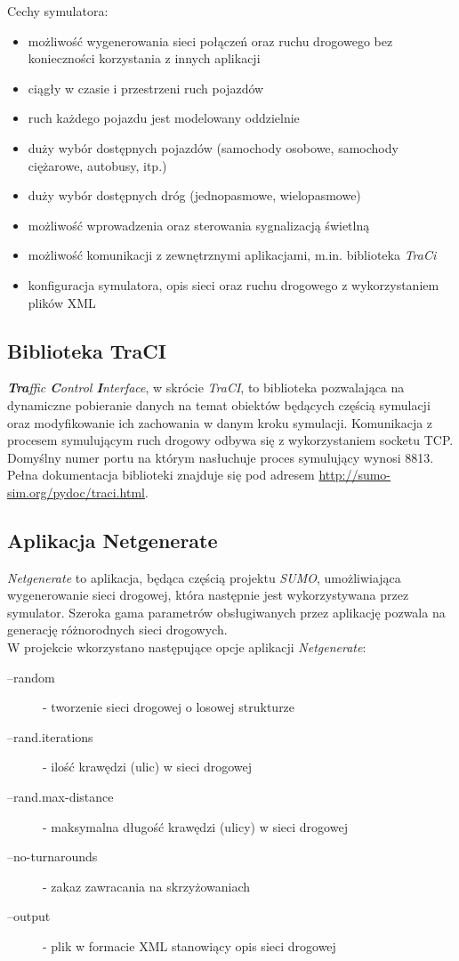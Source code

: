\documentclass[11pt,a4paper]{article}
\begin{document}
Cechy symulatora:
\begin{itemize}
	\item możliwość wygenerowania sieci połączeń oraz ruchu drogowego bez konieczności korzystania z innych aplikacji
	\item ciągły w czasie i przestrzeni ruch pojazdów
	\item ruch każdego pojazdu jest modelowany oddzielnie
	\item duży wybór dostępnych pojazdów (samochody osobowe, samochody ciężarowe, autobusy, itp.)
	\item duży wybór dostępnych dróg (jednopasmowe, wielopasmowe)
	\item możliwość wprowadzenia oraz sterowania sygnalizacją świetlną
	\item możliwość komunikacji z zewnętrznymi aplikacjami, m.in. biblioteka \emph{TraCi}
	\item konfiguracja symulatora, opis sieci oraz ruchu drogowego z wykorzystaniem plików XML
\end{itemize} 

\subsection{Biblioteka TraCI}

\emph{\textbf{Tra}ffic \textbf{C}ontrol \textbf{I}nterface}, w skrócie \emph{TraCI}, to biblioteka pozwalająca na dynamiczne pobieranie danych na temat obiektów będących częścią symulacji oraz modyfikowanie ich zachowania w danym kroku symulacji. Komunikacja z procesem symulującym ruch drogowy odbywa się z wykorzystaniem socketu TCP. Domyślny numer portu na którym nasłuchuje proces symulujący wynosi 8813. Pełna dokumentacja biblioteki znajduje się pod adresem \url{http://sumo-sim.org/pydoc/traci.html}.

\subsection{Aplikacja Netgenerate}

\emph{Netgenerate} to aplikacja, będąca częścią projektu \emph{SUMO}, umożliwiająca wygenerowanie sieci drogowej, która następnie jest wykorzystywana przez symulator. Szeroka gama parametrów obsługiwanych przez aplikację pozwala na generację różnorodnych sieci drogowych.\\[0.5cm]
W projekcie wkorzystano następujące opcje aplikacji \emph{Netgenerate}:
\begin{description}
	\item[--random] - tworzenie sieci drogowej o losowej strukturze
	\item[--rand.iterations] - ilość krawędzi (ulic) w sieci drogowej
	\item[--rand.max-distance] - maksymalna długość krawędzi (ulicy) w sieci drogowej
	\item[--no-turnarounds] - zakaz zawracania na skrzyżowaniach
	\item[--output] - plik w formacie XML stanowiący opis sieci drogowej
\end{description}
\end{document}

